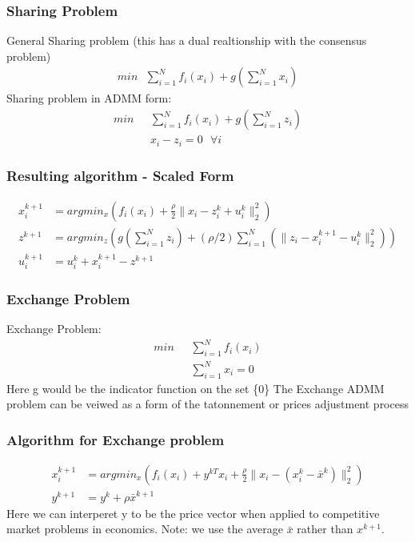 \documentclass{beamer}
\begin{document}
\begin{frame}
  \frametitle{Sharing Problem}
  General Sharing problem (this has a dual realtionship with the consensus problem)
  \begin{align}
    min \: \: \: \sum_{i=1}^{N} f_{i}(x_{i}) + g(\sum_{i=1}^{N} x_{i})
  \end{align}
  Sharing problem in ADMM form:
  \begin{align}
    min \: \: \: &\sum_{i=1}^{N} f_{i}(x_{i}) + g(\sum_{i=1}^{N} z_{i}) \\
    & x_{i} - z_{i} = 0 \: \: \: \forall i
  \end{align}
\end{frame}

\begin{frame}
  \frametitle{Resulting algorithm - Scaled Form}
  \begin{align}
    x_{i}^{k+1} &= argmin_{x} \left(f_{i}(x_{i}) +  \frac{\rho}{2} \|x_{i} - z_{i}^{k} + u_{i}^{k} \|_{2}^{2}    \right) \\
    z^{k+1} &= argmin_{z} \left( g(\sum_{i=1}^{N} z_{i}) + (\rho/2) \sum_{i=1}^{N} \left(\|z_{i}-x_{i}^{k+1} - u_{i}^{k}\|_{2}^{2}  \right)  \right) \\
    u_{i}^{k+1} &= u_{i}^{k} +  x_{i}^{k+1} - z^{k+1}
  \end{align}
\end{frame}

\begin{frame}
  \frametitle{Exchange Problem}
  Exchange Problem:
  \begin{align}
    min \: \: \: &\sum_{i=1}^{N} f_{i}(x_{i}) \\
    & \sum_{i=1}^{N} x_{i} = 0
  \end{align}
  Here g would be the indicator function on the set \{0\}
  \linebreak
  \newline
  The Exchange ADMM problem can be veiwed as a form of the tatonnement or prices adjustment process
\end{frame}

\begin{frame}
  \frametitle{Algorithm for Exchange problem}
  \begin{align}
    x_{i}^{k+1} &= argmin_{x} \left( f_{i}(x_{i}) + y^{kT}x_{i} + \frac{\rho}{2} \|x_{i} - ( x_{i}^{k} - \bar{x}^{k} )\|_{2}^{2}   \right)  \\
    y^{k+1} &= y^{k} + \rho \bar{x}^{k+1} 
  \end{align}
  Here we can interperet y to be the price vector when applied to competitive market problems in economics. Note: we use the average $\bar{x}$ rather than $x^{k+1}$.
\end{frame}
\end{document}
